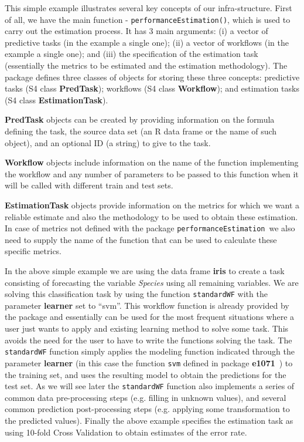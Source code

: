 \documentclass[10pt,a4paper]{article}\usepackage[]{graphicx}\usepackage[]{color}
\newcommand{\PE}{package \texttt{performanceEstimation}\ }
\begin{document}
This simple example illustrates several key concepts of our
infra-structure. First of all, we have the main function  -
\texttt{performanceEstimation()}, which is used to carry out
the estimation process. It has 3 main arguments: (i) a vector of
predictive tasks (in the example a single one); (ii) a vector of workflows (in the example a single one); and (iii) the
specification of the estimation task (essentially the metrics to be estimated and the estimation methodology). The package defines three classes of objects for storing these three concepts: predictive tasks (S4 class \textbf{PredTask}); workflows (S4 class \textbf{Workflow}); and estimation tasks (S4 class \textbf{EstimationTask}).

\textbf{PredTask} objects can be created by providing information on the formula defining the task, the source data set (an R data frame or the name of such object), and an optional ID (a string) to give to the task.

\textbf{Workflow} objects include information on the name of the function implementing the workflow and any number of parameters to be passed to this function when it will be called with different train and test sets.

\textbf{EstimationTask} objects provide information on the metrics for which we want a reliable estimate and also the methodology to be used to obtain these estimation. In case of metrics not defined with the \PE we also need to supply the name of the function that can be used to calculate these specific metrics.

In the above simple example we are using the data frame \textbf{iris} to create a task consisting of forecasting the variable \textit{Species} using all remaining variables. We are solving this classification task by using the function \texttt{standardWF} with the parameter \textbf{learner} set to ``svm''. This workflow function is already provided by the package and essentially can be used for the most frequent situations where a user just wants to apply and existing learning method to solve some task. This avoids the need for the user to have to write the functions solving the task. The \texttt{standardWF} function simply applies the modeling function indicated through the parameter \textbf{learner} (in this case the function \texttt{svm} defined in package \textbf{e1071}~\cite{e1071}) to the training set, and uses the resulting model to obtain the predictions for the test set. As we will see later the \texttt{standardWF} function also implements a series of common data pre-processing steps (e.g. filling in unknown values), and several common prediction post-processing steps (e.g. applying some transformation to the predicted values). Finally the above example specifies the estimation task as using 10-fold Cross Validation to obtain estimates of the error rate. 
\end{document}
